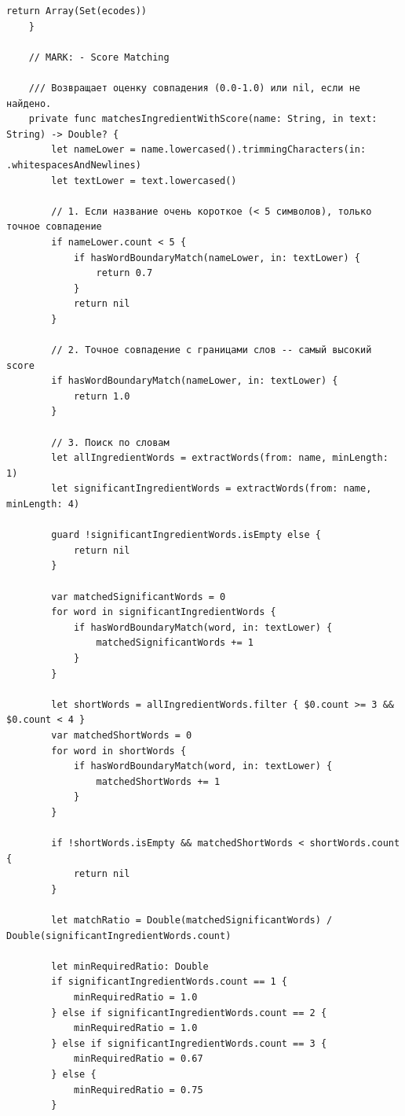 \begin{lstlisting}[basicstyle=\tiny\ttfamily,breaklines=true]
        return Array(Set(ecodes))
    }

    // MARK: - Score Matching

    /// Возвращает оценку совпадения (0.0-1.0) или nil, если не найдено.
    private func matchesIngredientWithScore(name: String, in text: String) -> Double? {
        let nameLower = name.lowercased().trimmingCharacters(in: .whitespacesAndNewlines)
        let textLower = text.lowercased()

        // 1. Если название очень короткое (< 5 символов), только точное совпадение
        if nameLower.count < 5 {
            if hasWordBoundaryMatch(nameLower, in: textLower) {
                return 0.7
            }
            return nil
        }

        // 2. Точное совпадение с границами слов -- самый высокий score
        if hasWordBoundaryMatch(nameLower, in: textLower) {
            return 1.0
        }

        // 3. Поиск по словам
        let allIngredientWords = extractWords(from: name, minLength: 1)
        let significantIngredientWords = extractWords(from: name, minLength: 4)

        guard !significantIngredientWords.isEmpty else {
            return nil
        }

        var matchedSignificantWords = 0
        for word in significantIngredientWords {
            if hasWordBoundaryMatch(word, in: textLower) {
                matchedSignificantWords += 1
            }
        }

        let shortWords = allIngredientWords.filter { $0.count >= 3 && $0.count < 4 }
        var matchedShortWords = 0
        for word in shortWords {
            if hasWordBoundaryMatch(word, in: textLower) {
                matchedShortWords += 1
            }
        }

        if !shortWords.isEmpty && matchedShortWords < shortWords.count {
            return nil
        }

        let matchRatio = Double(matchedSignificantWords) / Double(significantIngredientWords.count)

        let minRequiredRatio: Double
        if significantIngredientWords.count == 1 {
            minRequiredRatio = 1.0
        } else if significantIngredientWords.count == 2 {
            minRequiredRatio = 1.0
        } else if significantIngredientWords.count == 3 {
            minRequiredRatio = 0.67
        } else {
            minRequiredRatio = 0.75
        }


\end{lstlisting}
